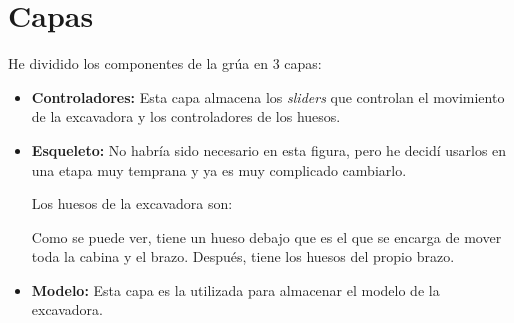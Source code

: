 \section{Capas}

He dividido los componentes de la grúa en 3 capas:

\begin{itemize}
    \item \textbf{Controladores: }Esta capa almacena los \textit{sliders} que controlan el movimiento de la excavadora y los controladores de los huesos.
    

    \item \textbf{Esqueleto: }No habría sido necesario en esta figura, pero he decidí usarlos en una etapa muy temprana y ya es muy complicado cambiarlo.
    
    Los huesos de la excavadora son:



    Como se puede ver, tiene un hueso debajo que es el que se encarga de mover toda la cabina y el brazo. Después, tiene los huesos del propio brazo.

    \item \textbf{Modelo: }Esta capa es la utilizada para almacenar el modelo de la excavadora.
    
\end{itemize}